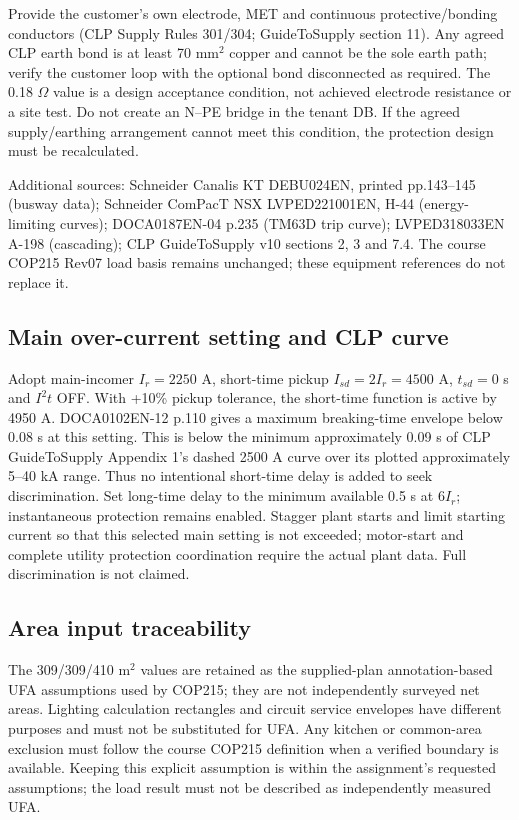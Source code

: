 Provide the customer's own electrode, MET and continuous protective/bonding conductors (CLP Supply Rules 301/304; GuideToSupply section 11). Any agreed CLP earth bond is at least 70 mm$^2$ copper and cannot be the sole earth path; verify the customer loop with the optional bond disconnected as required. The 0.18 $\Omega$ value is a design acceptance condition, not achieved electrode resistance or a site test. Do not create an N--PE bridge in the tenant DB. If the agreed supply/earthing arrangement cannot meet this condition, the protection design must be recalculated.

\noindent Additional sources: Schneider Canalis KT DEBU024EN, printed pp.143--145 (busway data); Schneider ComPacT NSX LVPED221001EN, H-44 (energy-limiting curves); DOCA0187EN-04 p.235 (TM63D trip curve); LVPED318033EN A-198 (cascading); CLP GuideToSupply v10 sections 2, 3 and 7.4. The course COP215 Rev07 load basis remains unchanged; these equipment references do not replace it.


\subsection*{Main over-current setting and CLP curve}
Adopt main-incomer $I_r=2250$ A, short-time pickup $I_{sd}=2I_r=4500$ A, $t_{sd}=0$ s and $I^2t$ OFF. With +10\% pickup tolerance, the short-time function is active by 4950 A. DOCA0102EN-12 p.110 gives a maximum breaking-time envelope below 0.08 s at this setting. This is below the minimum approximately 0.09 s of CLP GuideToSupply Appendix 1's dashed 2500 A curve over its plotted approximately 5--40 kA range. Thus no intentional short-time delay is added to seek discrimination. Set long-time delay to the minimum available 0.5 s at $6I_r$; instantaneous protection remains enabled. Stagger plant starts and limit starting current so that this selected main setting is not exceeded; motor-start and complete utility protection coordination require the actual plant data. Full discrimination is not claimed.

\subsection*{Area input traceability}
The 309/309/410 m$^2$ values are retained as the supplied-plan annotation-based UFA assumptions used by COP215; they are not independently surveyed net areas. Lighting calculation rectangles and circuit service envelopes have different purposes and must not be substituted for UFA. Any kitchen or common-area exclusion must follow the course COP215 definition when a verified boundary is available. Keeping this explicit assumption is within the assignment's requested assumptions; the load result must not be described as independently measured UFA.
